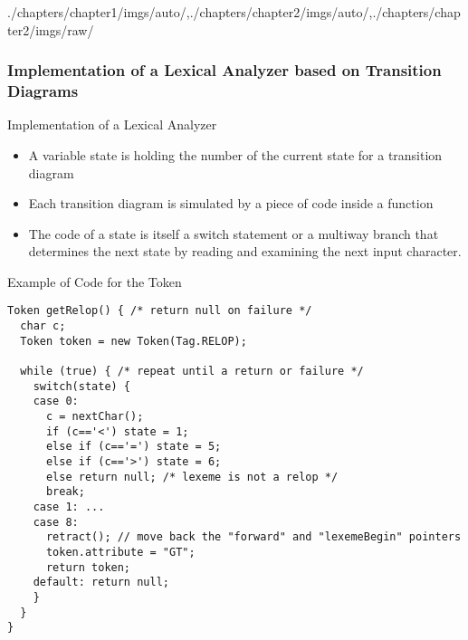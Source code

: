 \begin{graphicspathcontext}{{./chapters/chapter1/imgs/auto/},{./chapters/chapter2/imgs/auto/},{./chapters/chapter2/imgs/raw/}}
\begin{bibunit}[apalike]
\subsubsection{Implementation of a Lexical Analyzer based on Transition Diagrams}
\subsubsectiontableofcontentslide

\begin{frame}{Implementation of a Lexical Analyzer}
	\begin{itemize}
	\item A variable state is holding the number of the current state for a transition diagram
	\vspace{.5cm}
	\item Each transition diagram is simulated by a piece of code inside a function
	\vspace{.5cm}
	\item The code of a state is itself a switch statement or a multiway branch that determines the next state by reading and examining the next input character.
	\end{itemize}
\end{frame}

\begin{frame}[t,fragile]{Example of Code for the Token }
	\begin{lstlisting}[style=lststyle-java]
Token getRelop() { /* return null on failure */
  char c;
  Token token = new Token(Tag.RELOP);

  while (true) { /* repeat until a return or failure */
    switch(state) {
    case 0: 
      c = nextChar();
      if (c=='<') state = 1;
      else if (c=='=') state = 5;
      else if (c=='>') state = 6;
      else return null; /* lexeme is not a relop */
      break;
    case 1: ...
    case 8:
      retract(); // move back the "forward" and "lexemeBegin" pointers
      token.attribute = "GT";
      return token;
    default: return null;
    }
  }
}
	\end{lstlisting}
\end{frame}


\end{bibunit}
\end{graphicspathcontext}
